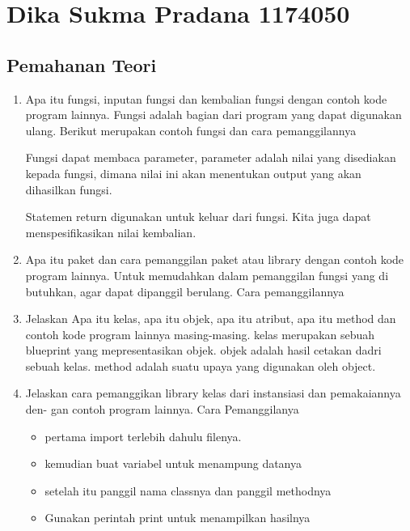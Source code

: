 \section{Dika Sukma Pradana 1174050}
\subsection{Pemahanan Teori}
\begin{enumerate}
    \item Apa itu fungsi, inputan fungsi dan kembalian fungsi dengan contoh kode program
    lainnya.
    Fungsi adalah bagian dari program yang dapat digunakan ulang.
    Berikut merupakan contoh fungsi dan cara pemanggilannya
    

    Fungsi dapat membaca parameter, parameter adalah nilai yang disediakan kepada fungsi, dimana nilai ini akan menentukan output yang akan dihasilkan fungsi.
    

    Statemen return digunakan untuk keluar dari fungsi. Kita juga dapat menspesifikasikan nilai kembalian.
    

    \item Apa itu paket dan cara pemanggilan paket atau library dengan contoh kode
    program lainnya.
    Untuk memudahkan dalam pemanggilan fungsi yang di butuhkan, agar dapat dipanggil berulang.
    Cara pemanggilannya
    

    \item Jelaskan Apa itu kelas, apa itu objek, apa itu atribut, apa itu method dan
    contoh kode program lainnya masing-masing.
    kelas merupakan sebuah blueprint yang mepresentasikan objek.
    objek adalah hasil cetakan dadri sebuah kelas.
    method adalah suatu upaya yang digunakan oleh object.
    

    \item Jelaskan cara pemanggikan library kelas dari instansiasi dan pemakaiannya den-
    gan contoh program lainnya.
    Cara Pemanggilanya 
    \begin{itemize}
        \item pertama import terlebih dahulu filenya.
        \item kemudian buat variabel untuk menampung datanya
        \item setelah itu panggil nama classnya dan panggil methodnya
        \item Gunakan perintah print untuk menampilkan hasilnya


\end{itemize}
\end{enumerate}
